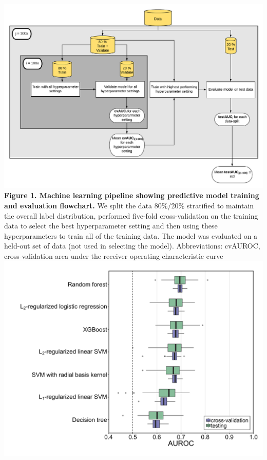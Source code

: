 \documentclass[11pt,]{article}
\begin{document}
\includegraphics{Figure_1} \textbf{Figure 1. Machine learning pipeline
showing predictive model training and evaluation flowchart. } We split
the data 80\%/20\% stratified to maintain the overall label
distribution, performed five-fold cross-validation on the training data
to select the best hyperparameter setting and then using these
hyperparameters to train all of the training data. The model was
evaluated on a held-out set of data (not used in selecting the model).
Abbreviations: cvAUROC, cross-validation area under the receiver
operating characteristic curve \newpage
\includegraphics{Figure_2.png}
\end{document}

